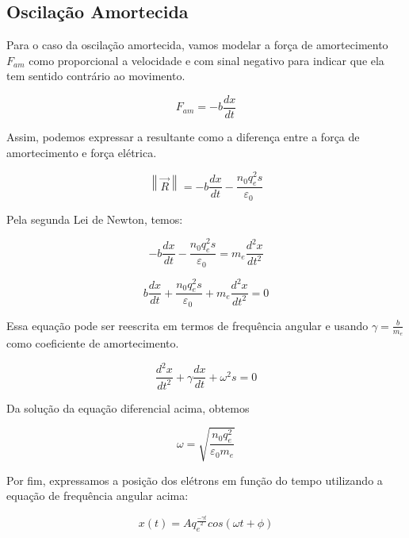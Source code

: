 \documentclass[
	article,
	11pt,
	oneside,
	a4paper,
	english,
	brazil,
	sumario=tradicional
	]{abntex2}
\newcommand{\norm}[1]{\left\lVert#1\right\rVert}
\begin{document}
\subsection{Oscilação Amortecida}

Para o caso da oscilação amortecida, vamos modelar a força de amortecimento $F_{am}$ como proporcional a velocidade e com sinal negativo para indicar que ela tem sentido contrário ao movimento.

\begin{equation} \label{forca-amortecimento}
  F_{am} = -b\frac{dx}{dt}
\end{equation}

Assim, podemos expressar a resultante como a diferença entre a força de amortecimento e força elétrica.

\begin{equation}
  \norm{\vec{R}} = -b\frac{dx}{dt} - \frac{n_0 q_e^2 s}{\varepsilon _0~}
\end{equation}

Pela segunda Lei de Newton, temos:

\begin{equation}
  -b\frac{dx}{dt} - \frac{n_0 q_e^2 s}{\varepsilon _0~} = m_e\frac{d^2x}{dt^2}
\end{equation}

\begin{equation}
  b\frac{dx}{dt} + \frac{n_0 q_e^2 s}{\varepsilon _0~} + m_e\frac{d^2x}{dt^2} = 0
\end{equation}

Essa equação pode ser reescrita em termos de frequência angular e usando $\gamma = \frac{b}{m_e}$ como coeficiente de amortecimento.

\begin{equation} \label{equacao-diferencial-omega}
  \frac{d^2x}{dt^2}  + \gamma\frac{dx}{dt} + \omega^2 s= 0
\end{equation}

Da solução da equação diferencial acima, obtemos

\begin{equation}
  \omega=\sqrt{\frac{n_0 q_e^2}{\varepsilon_0 m_e}}
\end{equation}

Por fim, expressamos a posição dos elétrons em função do tempo utilizando a equação de frequência angular acima:

\begin{equation}
  x(t) = A q_e^{\frac{-\gamma t}{2}} cos(\omega t + \phi)
\end{equation}
\end{document}
